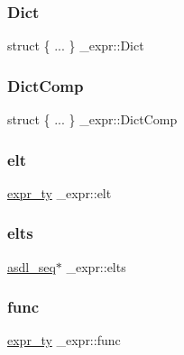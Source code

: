 \mbox{\label{struct__expr_a48e057a68636f610c7213e6ead9d4e12}} 
\subsubsection{\texorpdfstring{Dict}{Dict}}
{\footnotesize\ttfamily struct \{ ... \}   \+\_\+expr\+::\+Dict}

\mbox{\label{struct__expr_a6978da5afa53a16a678946bdedcc10d7}} 
\subsubsection{\texorpdfstring{DictComp}{DictComp}}
{\footnotesize\ttfamily struct \{ ... \}   \+\_\+expr\+::\+Dict\+Comp}

\mbox{\label{struct__expr_a22e1f5d3783691e4f75667ef8b0ccea7}} 
\subsubsection{\texorpdfstring{elt}{elt}}
{\footnotesize\ttfamily \mbox{\hyperlink{_python-ast_8h_a56d3705e020a071405094a220c4592bd}{expr\+\_\+ty}} \+\_\+expr\+::elt}

\mbox{\label{struct__expr_a2b2486ad2f3a81e7d67645975c98c770}} 
\subsubsection{\texorpdfstring{elts}{elts}}
{\footnotesize\ttfamily \mbox{\hyperlink{structasdl__seq}{asdl\+\_\+seq}}$\ast$ \+\_\+expr\+::elts}

\mbox{\label{struct__expr_af1cec68dd6f13ce076cee38ddaff18ab}} 
\subsubsection{\texorpdfstring{func}{func}}
{\footnotesize\ttfamily \mbox{\hyperlink{_python-ast_8h_a56d3705e020a071405094a220c4592bd}{expr\+\_\+ty}} \+\_\+expr\+::func}

